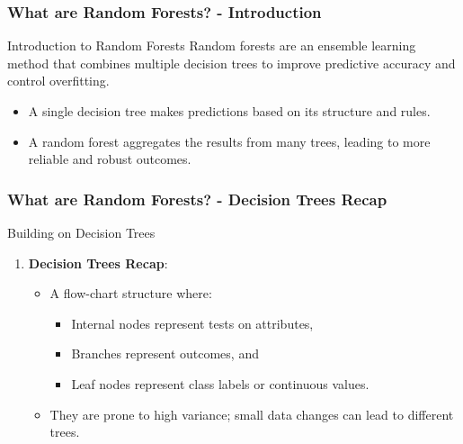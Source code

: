 \documentclass[aspectratio=169]{beamer}
\begin{document}
\begin{frame}[fragile]
    \frametitle{What are Random Forests? - Introduction}
    \begin{block}{Introduction to Random Forests}
        Random forests are an ensemble learning method that combines multiple decision trees to improve predictive accuracy and control overfitting. 
        \begin{itemize}
            \item A single decision tree makes predictions based on its structure and rules.
            \item A random forest aggregates the results from many trees, leading to more reliable and robust outcomes.
        \end{itemize}
    \end{block}
\end{frame}

\begin{frame}[fragile]
    \frametitle{What are Random Forests? - Decision Trees Recap}
    \begin{block}{Building on Decision Trees}
        \begin{enumerate}
            \item \textbf{Decision Trees Recap}:
            \begin{itemize}
                \item A flow-chart structure where:
                \begin{itemize}
                    \item Internal nodes represent tests on attributes,
                    \item Branches represent outcomes, and
                    \item Leaf nodes represent class labels or continuous values.
                \end{itemize}
                \item They are prone to high variance; small data changes can lead to different trees.
            \end{itemize}
        \end{enumerate}
    \end{block}
\end{frame}
\end{document}
